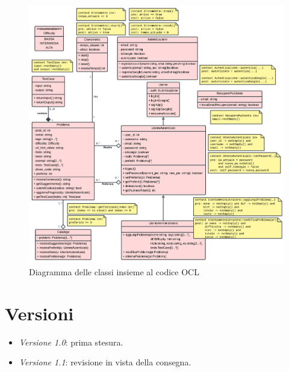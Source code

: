 \documentclass[11pt, a4paper]{article}
\theoremstyle{definition} %
\begin{document}
\begin{figure}[H]
\centering
\hspace*{-2.5cm}
\includegraphics[scale = 0.6]{materiale/classdiagram.pdf}
\caption{Diagramma delle classi insieme al codice OCL}
\label{umlocl}
\end{figure}


\newpage
\section*{Versioni}
\begin{itemize}
    \item \textit{Versione 1.0}: prima stesura.
    \item \textit{Versione 1.1}: revisione in vista della consegna.
\end{itemize}
\end{document}
